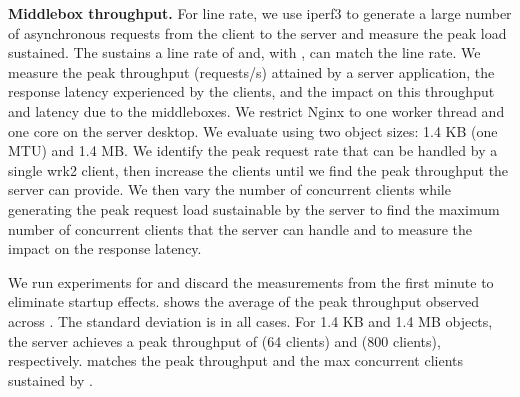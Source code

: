 \textbf{Middlebox throughput.}
For line rate, we use iperf3  to generate a large number of
asynchronous requests from the client to the server and measure the peak load
sustained.  The {\base} sustains a line rate of  and, with
, {\nsnoshape} can match the {\base} line rate. 
\fi
%
We measure the peak throughput (requests/s) attained by a server application,
the response latency experienced by the clients, and the impact on this
throughput and latency due to the middleboxes.
We restrict Nginx to one worker thread and one core on the server desktop.
We evaluate using two object sizes: 1.4 KB (one MTU) and 1.4 MB.
We identify the peak request rate that can be handled by a single wrk2 client,
then increase the clients until we find the peak throughput the server can
provide.
We then vary the number of concurrent clients while generating the peak request
load sustainable by the server to find the maximum number of concurrent clients
that the server can handle and to measure the impact on the response latency.

We run experiments for  and discard the measurements from the
first minute to eliminate startup effects.
 shows the average of the peak throughput
observed across .
The standard deviation is  in all cases. For 1.4 KB and 1.4 MB
objects, the {\base} server achieves a peak throughput of 
\update(64 clients) and  (800 clients), respectively.
{\nsnoshape} matches the peak throughput and the max concurrent clients
sustained by {\base}.

